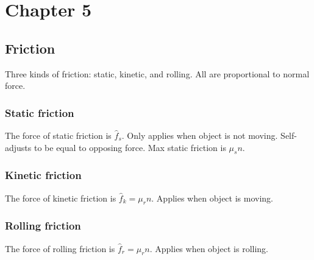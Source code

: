 \section{Chapter 5}

\subsection{Friction}

Three kinds of friction: static, kinetic, and rolling. All are proportional to normal force.

\subsubsection{Static friction}

The force of static friction is $\hat{f}_s$. Only applies when object is not moving. Self-adjusts to be equal to opposing force.
Max static friction is $\mu_s n$.

\subsubsection{Kinetic friction}

The force of kinetic friction is $\hat{f}_k = \mu_r n$. Applies when object is moving.

\subsubsection{Rolling friction}

The force of rolling friction is $\hat{f}_r = \mu_r n$. Applies when object is rolling.
